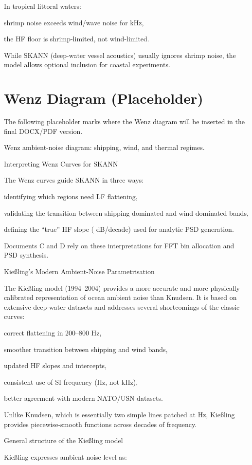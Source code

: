 \documentclass[12pt]{article}
\begin{document}
In tropical littoral waters:

shrimp noise exceeds wind/wave noise for  kHz,

the HF floor is shrimp-limited, not wind-limited.

While SKANN (deep-water vessel acoustics) usually ignores shrimp noise, the model allows optional inclusion for coastal experiments.

\section*{Wenz Diagram (Placeholder)}
The following placeholder marks where the Wenz diagram will be inserted in the final DOCX/PDF version.

Wenz ambient-noise diagram: shipping, wind, and thermal regimes.

Interpreting Wenz Curves for SKANN

The Wenz curves guide SKANN in three ways:

identifying which regions need LF flattening,

validating the transition between shipping-dominated and wind-dominated bands,

defining the “true” HF slope ( dB/decade) used for analytic PSD generation.

Documents C and D rely on these interpretations for FFT bin allocation and PSD synthesis.

Kießling’s Modern Ambient-Noise Parametrisation

The Kießling model (1994–2004) provides a more accurate and more physically calibrated representation of ocean ambient noise than Knudsen. It is based on extensive deep-water datasets and addresses several shortcomings of the classic curves:

correct flattening in 200–800 Hz,

smoother transition between shipping and wind bands,

updated HF slopes and intercepts,

consistent use of SI frequency (Hz, not kHz),

better agreement with modern NATO/USN datasets.

Unlike Knudsen, which is essentially two simple lines patched at  Hz, Kießling provides piecewise-smooth functions across decades of frequency.

General structure of the Kießling model

Kießling expresses ambient noise level as:
\end{document}
